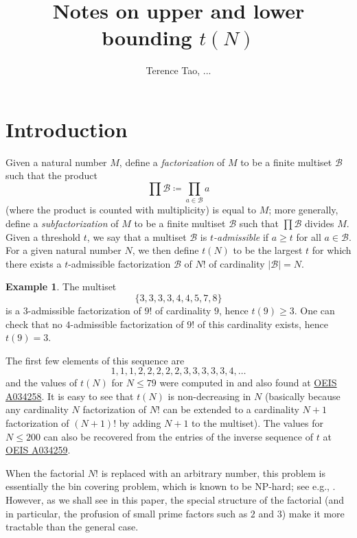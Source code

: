 \documentclass[12pt,a4paper,reqno]{amsart}
\numberwithin{equation}{section}
\theoremstyle{plain}
\theoremstyle{definition}
\newtheorem{example}[theorem]{Example}
\newcommand\tuple{{\mathcal B}}
\begin{document}
\title{Notes on upper and lower bounding $t(N)$}

\author{Terence Tao, ...}
\maketitle


\section{Introduction}

Given a natural number $M$, define a \emph{factorization} of $M$ to be a finite multiset $\tuple$ such that the product
$$ \prod \tuple \coloneqq \prod_{a \in \tuple} a$$
(where the product is counted with multiplicity) is equal to $M$; more generally, define a \emph{subfactorization} of $M$ to be a finite multiset $\tuple$ such that $\prod \tuple$ divides $M$.  Given a threshold $t$, we say that a multiset $\tuple$ is \emph{$t$-admissible} if $a \geq t$ for all $a \in \tuple$.  For a given natural number $N$, we then define $t(N)$ to be the largest $t$ for which there exists a $t$-admissible factorization $\tuple$ of $N!$ of cardinality $|\tuple|=N$.  

\begin{example}  The multiset
  $$ \{ 3,3,3,3,4,4,5,7,8\}$$
  is a $3$-admissible factorization of $9!$ of cardinality $9$, hence $t(9) \geq 3$.  One can check that no $4$-admissible factorization of $9!$ of this cardinality exists, hence $t(9) = 3$.
\end{example}

The first few elements of this sequence are
$$ 1,1,1,2,2,2,2,2,3,3,3,3,3,4, \dots$$
and the values of $t(N)$ for $N \leq 79$ were computed in \cite{guy} and also found at \href{https://oeis.org/A034258}{OEIS A034258}.  It is easy to see that $t(N)$ is non-decreasing in $N$ (basically because any cardinality $N$ factorization of $N!$ can be extended to a cardinality $N+1$ factorization of $(N+1)!$ by adding $N+1$ to the multiset).  The values for $N \leq 200$ can also be recovered from the entries of the inverse sequence of $t$ at \href{https://oeis.org/A034259}{OEIS A034259}.  

When the factorial $N!$ is replaced with an arbitrary number, this problem is essentially the bin covering problem, which is known to be NP-hard; see e.g., \cite{bincover}.  However, as we shall see in this paper, the special structure of the factorial (and in particular, the profusion of small prime factors such as $2$ and $3$) make it more tractable than the general case.
\end{document}
